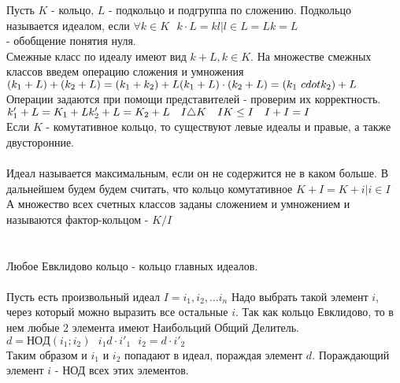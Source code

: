 \begin{center}
\end{center}

Пусть $K$ - кольцо, $L$ - подкольцо и подгруппа по сложению. Подкольцо 
называется идеалом, если $\forall k \in K ~~~ k \cdot L = {kl | l \in L} = 
Lk = L$\\
 - обобщение понятия нуля.\\
Смежные класс по идеалу имеют вид $k + L, k \in K$. На множестве смежных классов
введем операцию сложения и умножения\\
$(k_1 + L) + (k_2 + L) = (k_1 + k_2) + L\\
(k_1 + L) \cdot (k_2 + L) = (k_1 \ cdot k_2) + L$\\
Операции задаются при помощи представителей - проверим их корректность.\\
$k'_1 + L = K_1 + L\\
k'_2 + L = K_2 + L ~~~ I \triangle K ~~~ IK \le I ~~~ I + I = I$\\
Если $K$ - комутативное кольцо, то существуют левые идеалы и правые, а также 
двусторонние.\\

\\
Идеал называется максимальным, если он не содержится не в каком больше. 
В дальнейшем будем будем считать, что кольцо комутативное $K + I = {K + i 
| i \in I}$\\
А множество всех счетных классов заданы сложением и умножением и называются 
фактор-кольцом - $K/I$\\

\\

\\
Любое Евклидово кольцо - кольцо главных идеалов.\\
\\
Пусть есть произвольный идеал $I = {i_1, i_2, ... i_n}$ Надо выбрать такой 
элемент $i$, через который можно выразить все остальные $i$. Так как кольцо 
Евклидово, то в нем любые 2 элемента имеют Наибольций Общий Делитель.\\
$d = НОД(i_1; i_2) ~~~ i_1 d \cdot i'_1 ~~~ i_2 = d \cdot i'_2$\\
Таким образом и $i_1$ и $i_2$ попадают в идеал, пораждая элемент $d$.
Пораждающий элемент $i$ - НОД всех этих элементов.\\


